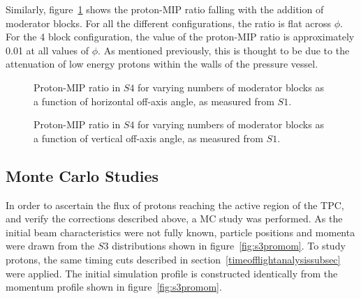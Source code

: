 Similarly, figure~\ref{fig:propiratio_s4_vert} shows the proton-MIP ratio falling with the addition of moderator blocks.
For all the different configurations, the ratio is flat across $\phi$.
For the 4 block configuration, the value of the proton-MIP ratio is approximately 0.01 at all values of $\phi$.
As mentioned previously, this is thought to be due to the attenuation of low energy protons within the walls of the pressure vessel.

\begin{figure}[!ht]
  \begin{minipage}[t]{0.48\textwidth}
    \begin{adjustbox}{max totalsize={\textwidth}{.35\textheight}, center}
      
    \end{adjustbox}
    \caption{Proton-MIP ratio in $\mathit{S4}$ for varying numbers of moderator blocks as a function of horizontal off-axis angle, as measured from $\mathit{S1}$.}
    \label{fig:propiratio_s4_horz}
  \end{minipage}
  \hspace{0.3cm}
  \begin{minipage}[t]{0.48\textwidth}
    \begin{adjustbox}{max totalsize={\textwidth}{.35\textheight}, center}
      
    \end{adjustbox}
    \caption{Proton-MIP ratio in $\mathit{S4}$ for varying numbers of moderator blocks as a function of vertical off-axis angle, as measured from $\mathit{S1}$.}
    \label{fig:propiratio_s4_vert}
  \end{minipage}	
\end{figure}

\subsection{Monte Carlo Studies}
In order to ascertain the flux of protons reaching the active region of the TPC, and verify the corrections described above, a MC study was performed. 
As the initial beam characteristics were not fully known, particle positions and momenta were drawn from the $\mathit{S3}$ distributions shown in figure~\ref{fig:s3promom}.
To study protons, the same timing cuts described in section~\ref{timeofflightanalysissubsec} were applied.
The initial simulation profile is constructed identically from the momentum profile shown in figure~\ref{fig:s3promom}.

